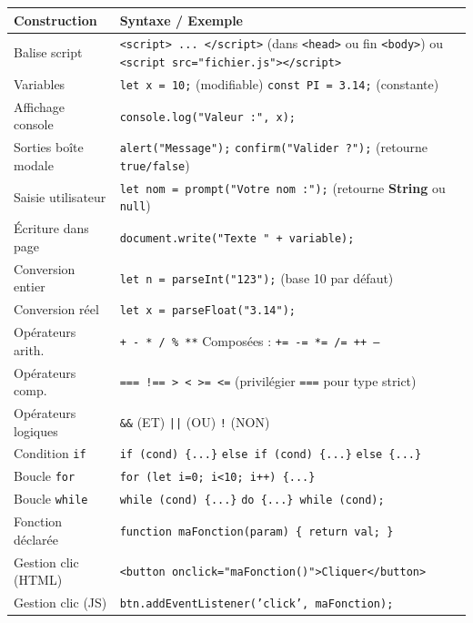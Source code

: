 \documentclass[11pt]{article}
\begin{document}
\begin{bilan}
\begin{center}
\begin{tabularx}{\linewidth}{|l|X|}\hline
\rowcolor{popblueL}
\textbf{Construction} & \textbf{Syntaxe / Exemple} \\\hline
Balise script & \texttt{<script> ... </script>} (dans \texttt{<head>} ou fin \texttt{<body>}) ou \texttt{<script src="fichier.js"></script>} \\\hline
Variables & \texttt{let x = 10;} (modifiable) \quad \texttt{const PI = 3.14;} (constante) \\\hline
Affichage console & \texttt{console.log("Valeur :", x);} \\\hline
Sorties boîte modale & \texttt{alert("Message");} \quad \texttt{confirm("Valider ?");} (retourne \texttt{true/false}) \\\hline
Saisie utilisateur & \texttt{let nom = prompt("Votre nom :");} (retourne \textbf{String} ou \texttt{null}) \\\hline
Écriture dans page & \texttt{document.write("Texte " + variable);} \\\hline
Conversion entier & \texttt{let n = parseInt("123");} (base 10 par défaut) \\\hline
Conversion réel & \texttt{let x = parseFloat("3.14");} \\\hline
Opérateurs arith. & \texttt{+ - * / \% **} \quad Composées : \texttt{+= -= *= /= ++ --} \\\hline
Opérateurs comp. & \texttt{=== !== > < >= <=} (privilégier \texttt{===} pour type strict) \\\hline
Opérateurs logiques & \texttt{\&\&} (ET) \quad \texttt{||} (OU) \quad \texttt{!} (NON) \\\hline
Condition \texttt{if} & \texttt{if (cond) \{...\}} \quad \texttt{else if (cond) \{...\}} \quad \texttt{else \{...\}} \\\hline
Boucle \texttt{for} & \texttt{for (let i=0; i<10; i++) \{...\}} \\\hline
Boucle \texttt{while} & \texttt{while (cond) \{...\}} \quad \texttt{do \{...\} while (cond);} \\\hline
Fonction déclarée & \texttt{function maFonction(param) \{ return val; \}} \\\hline
Gestion clic (HTML) & \texttt{<button onclick="maFonction()">Cliquer</button>} \\\hline
Gestion clic (JS) & \texttt{btn.addEventListener('click', maFonction);} \\\hline
\end{tabularx}
\end{center}


\end{bilan}
\end{document}
